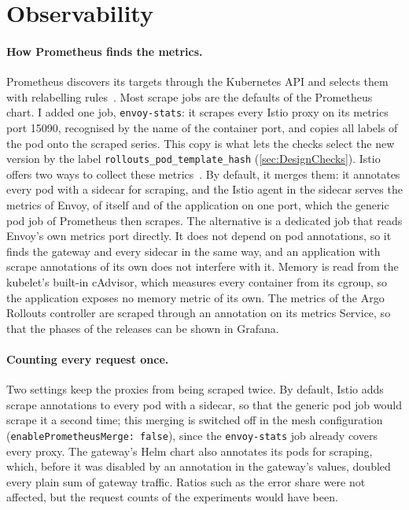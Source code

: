 \section{Observability}
\label{sec:ImplObservability}
\paragraph{How Prometheus finds the metrics.} Prometheus discovers its targets through the Kubernetes API and selects them with relabelling rules~\cite{PromConfig}. Most scrape jobs are the defaults of the Prometheus chart. I added one job, \texttt{envoy-stats}: it scrapes every Istio proxy on its metrics port 15090, recognised by the name of the container port, and copies all labels of the pod onto the scraped series. This copy is what lets the checks select the new version by the label \texttt{rollouts\_pod\_template\_hash} (\autoref{sec:DesignChecks}). Istio offers two ways to collect these metrics~\cite{IstioPrometheus}. By default, it merges them: it annotates every pod with a sidecar for scraping, and the Istio agent in the sidecar serves the metrics of Envoy, of itself and of the application on one port, which the generic pod job of Prometheus then scrapes. The alternative is a dedicated job that reads Envoy's own metrics port directly. It does not depend on pod annotations, so it finds the gateway and every sidecar in the same way, and an application with scrape annotations of its own does not interfere with it. Memory is read from the kubelet's built-in cAdvisor, which measures every container from its cgroup, so the application exposes no memory metric of its own. The metrics of the Argo Rollouts controller are scraped through an annotation on its metrics Service, so that the phases of the releases can be shown in Grafana.

\paragraph{Counting every request once.} Two settings keep the proxies from being scraped twice. By default, Istio adds scrape annotations to every pod with a sidecar, so that the generic pod job would scrape it a second time; this merging is switched off in the mesh configuration (\texttt{enablePrometheusMerge: false}), since the \texttt{envoy-stats} job already covers every proxy. The gateway's Helm chart also annotates its pods for scraping, which, before it was disabled by an annotation in the gateway's values, doubled every plain sum of gateway traffic. Ratios such as the error share were not affected, but the request counts of the experiments would have been.

